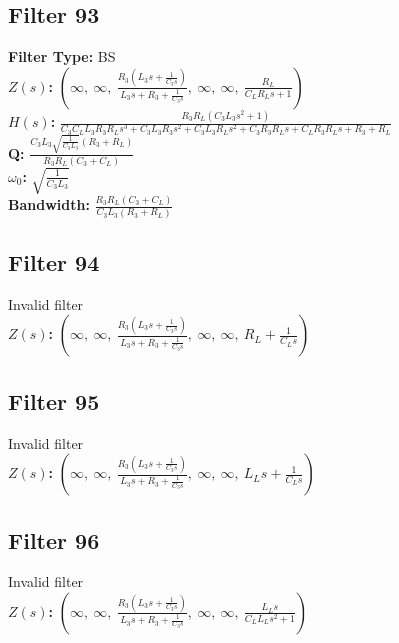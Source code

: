 \documentclass{article}
\begin{document}
\subsection*{Filter 93}
\textbf{Filter Type:} BS \\ 
\textbf{$Z(s)$:} $\left( \infty, \  \infty, \  \frac{R_{3} \left(L_{3} s + \frac{1}{C_{3} s}\right)}{L_{3} s + R_{3} + \frac{1}{C_{3} s}}, \  \infty, \  \infty, \  \frac{R_{L}}{C_{L} R_{L} s + 1}\right)$ \\ 
\textbf{$H(s)$:} $\frac{R_{3} R_{L} \left(C_{3} L_{3} s^{2} + 1\right)}{C_{3} C_{L} L_{3} R_{3} R_{L} s^{3} + C_{3} L_{3} R_{3} s^{2} + C_{3} L_{3} R_{L} s^{2} + C_{3} R_{3} R_{L} s + C_{L} R_{3} R_{L} s + R_{3} + R_{L}}$ \\ 
\textbf{Q:} $\frac{C_{3} L_{3} \sqrt{\frac{1}{C_{3} L_{3}}} \left(R_{3} + R_{L}\right)}{R_{3} R_{L} \left(C_{3} + C_{L}\right)}$ \\ 
\textbf{$\omega_0$:} $\sqrt{\frac{1}{C_{3} L_{3}}}$ \\ 
\textbf{Bandwidth:} $\frac{R_{3} R_{L} \left(C_{3} + C_{L}\right)}{C_{3} L_{3} \left(R_{3} + R_{L}\right)}$ \\ 
\subsection*{Filter 94}
Invalid filter \\ 
\textbf{$Z(s)$:} $\left( \infty, \  \infty, \  \frac{R_{3} \left(L_{3} s + \frac{1}{C_{3} s}\right)}{L_{3} s + R_{3} + \frac{1}{C_{3} s}}, \  \infty, \  \infty, \  R_{L} + \frac{1}{C_{L} s}\right)$ \\ 
\subsection*{Filter 95}
Invalid filter \\ 
\textbf{$Z(s)$:} $\left( \infty, \  \infty, \  \frac{R_{3} \left(L_{3} s + \frac{1}{C_{3} s}\right)}{L_{3} s + R_{3} + \frac{1}{C_{3} s}}, \  \infty, \  \infty, \  L_{L} s + \frac{1}{C_{L} s}\right)$ \\ 
\subsection*{Filter 96}
Invalid filter \\ 
\textbf{$Z(s)$:} $\left( \infty, \  \infty, \  \frac{R_{3} \left(L_{3} s + \frac{1}{C_{3} s}\right)}{L_{3} s + R_{3} + \frac{1}{C_{3} s}}, \  \infty, \  \infty, \  \frac{L_{L} s}{C_{L} L_{L} s^{2} + 1}\right)$ \\ 
\end{document}
